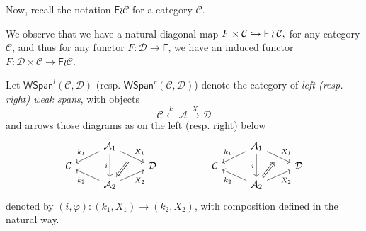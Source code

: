 \documentclass[a4paper,10pt
,draft
]{article}%
\renewcommand{\phi}{\varphi}
\renewcommand{\1}{\ensuremath{\mathbb{id}}}
\begin{document}

Now, recall the notation $\mathsf F \wr \mathcal C$ for a category $\mathcal C$.

\begin{remark}
      \label{WR_DIAG_REM}
      We observe that we have a natural diagonal map
      $
      F \times \mathcal C \hookrightarrow \mathsf F \wr \mathcal C,
      $
      for any category $\mathcal C$,
      and thus for any functor $F: \mathcal D \to \mathsf F$, we have an induced functor
      $F: \mathcal D \times \mathcal C \to \mathsf F \wr \mathcal C$. 
\end{remark}

\begin{definition}[{cf. \cite[Defn 4.3]{BP17}}]
      Let $\mathsf{WSpan}^l(\mathcal C, \mathcal D)$ (resp. $\mathsf{WSpan}^r(\mathcal C, \mathcal D)$)
      denote the category of \textit{left (resp. right) weak spans}, with objects
      \begin{equation}
            \mathcal C \xleftarrow{k} \mathcal A \xrightarrow{X} \mathcal D
      \end{equation}
      and arrows those diagrams as on the left (resp. right) below
      \begin{equation}
            \begin{tikzcd}[row sep = tiny]
                  & \mathcal A_1 \arrow[dr, "X_1", ""'{name=U}] \arrow[dl, "k_1"'] \arrow[dd, "i"']
                  &
                  &&
                  &
                  \mathcal A_1 \arrow[dr, "X_1", ""'{name=A}] \arrow[dl, "k_1"'] \arrow[dd, "i"']
                  \\
                  \mathcal C
                  &&
                  \mathcal D
                  &&
                  \mathcal C
                  &&
                  \mathcal D
                  \\
                  & |[alias=V]| \mathcal A_2 \arrow[ur, "X_2"'] \arrow[ul, "k_2"]
                  &
                  &&
                  &
                  |[alias=B]| \mathcal A_2 \arrow[ur, "X_2"'] \arrow[ul, "k_2"]
                  \arrow[Rightarrow, from = U, to = V]
                  \arrow[Rightarrow, from = B, to = A]
            \end{tikzcd}
      \end{equation}
      denoted by $(i,\phi): (k_1,X_1) \to (k_2,X_2)$, with composition defined in the natural way.      
\end{definition}
\end{document}
